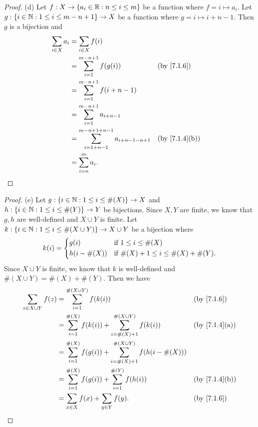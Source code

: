 \begin{proof}{(d)}
  Let \(f : X \to \{a_i \in \mathbb{R} : n \leq i \leq m\}\) be a function where \(f = i \mapsto a_i\).
  Let \(g : \{i \in \mathbb{N} : 1 \leq i \leq m - n + 1\} \to X\) be a function where \(g = i \mapsto i + n - 1\).
  Then \(g\) is a bijection and
  \begin{align*}
    \sum_{i \in X} a_i & = \sum_{i \in X} f(i)                                                                             \\
                       & = \sum_{i = 1}^{m - n + 1} f(g(i))                               &  & \text{(by \cref{7.1.6})}    \\
                       & = \sum_{i = 1}^{m - n + 1} f(i + n - 1)                                                           \\
                       & = \sum_{i = 1}^{m - n + 1} a_{i + n - 1}                                                          \\
                       & = \sum_{i = 1 + n - 1}^{m - n + 1 + n - 1} a_{i + n - 1 - n + 1} &  & \text{(by \cref{7.1.4}(b))} \\
                       & = \sum_{i = n}^m a_i.
  \end{align*}
\end{proof}

\begin{proof}{(e)}
  Let \(g : \{i \in \mathbb{N} : 1 \leq i \leq \#(X)\} \to X\) and \(h : \{i \in \mathbb{N} : 1 \leq i \leq \#(Y)\} \to Y\) be bijections.
  Since \(X, Y\) are finite, we know that \(g, h\) are well-defined and \(X \cup Y\) is finite.
  Let \(k : \{i \in \mathbb{N} : 1 \leq i \leq \#(X \cup Y)\} \to X \cup Y\) be a bijection where
  \[
    k(i) = \begin{dcases}
      g(i)         & \text{if } 1 \leq i \leq \#(X)                  \\
      h(i - \#(X)) & \text{if } \#(X) + 1 \leq i \leq \#(X) + \#(Y).
    \end{dcases}
  \]
  Since \(X \cup Y\) is finite, we know that \(k\) is well-defined and \(\#(X \cup Y) = \#(X) + \#(Y)\).
  Then we have
  \begin{align*}
    \sum_{z \in X \cup Y} f(z) & = \sum_{i = 1}^{\#(X \cup Y)} f(k(i))                                                &  & \text{(by \cref{7.1.6})}    \\
                               & = \sum_{i = 1}^{\#(X)} f(k(i)) + \sum_{i = \#(X) + 1}^{\#(X \cup Y)} f(k(i))         &  & \text{(by \cref{7.1.4}(a))} \\
                               & = \sum_{i = 1}^{\#(X)} f(g(i)) + \sum_{i = \#(X) + 1}^{\#(X \cup Y)} f(h(i - \#(X)))                                  \\
                               & = \sum_{i = 1}^{\#(X)} f(g(i)) + \sum_{i = 1}^{\#(Y)} f(h(i))                        &  & \text{(by \cref{7.1.4}(b))} \\
                               & = \sum_{x \in X} f(x) + \sum_{y \in Y} f(y).                                         &  & \text{(by \cref{7.1.6})}
  \end{align*}
\end{proof}

